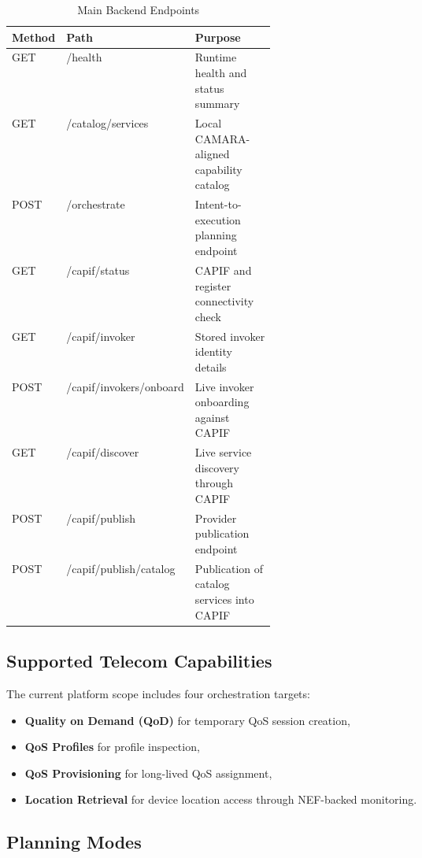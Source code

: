 \documentclass[conference]{IEEEtran}
\begin{document}
\begin{table}[h]
\caption{Main Backend Endpoints}
\label{tab:endpoints}
\centering
\small
\begin{tabularx}{\linewidth}{>{\raggedright\arraybackslash}p{0.12\linewidth} >{\ttfamily\raggedright\arraybackslash}p{0.27\linewidth} X}
\toprule
\textbf{Method} & \textbf{Path} & \textbf{Purpose} \\
\midrule
GET & /health & Runtime health and status summary \\
GET & /catalog/services & Local CAMARA-aligned capability catalog \\
POST & /orchestrate & Intent-to-execution planning endpoint \\
GET & /capif/status & CAPIF and register connectivity check \\
GET & /capif/invoker & Stored invoker identity details \\
POST & /capif/invokers/onboard & Live invoker onboarding against CAPIF \\
GET & /capif/discover & Live service discovery through CAPIF \\
POST & /capif/publish & Provider publication endpoint \\
POST & /capif/publish/catalog & Publication of catalog services into CAPIF \\
\bottomrule
\end{tabularx}
\end{table}

\subsection{Supported Telecom Capabilities}

The current platform scope includes four orchestration targets:

\begin{itemize}[leftmargin=1.1em]
\item \textbf{Quality on Demand (QoD)} for temporary QoS session creation,
\item \textbf{QoS Profiles} for profile inspection,
\item \textbf{QoS Provisioning} for long-lived QoS assignment,
\item \textbf{Location Retrieval} for device location access through NEF-backed monitoring.
\end{itemize}

\subsection{Planning Modes}
\end{document}
